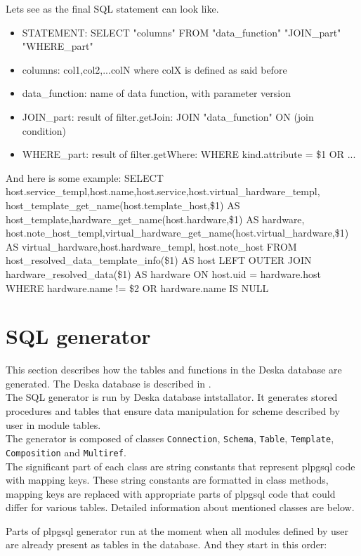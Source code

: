 \documentclass[deska]{subfiles}
\begin{document}
Lets see as the final SQL statement can look like.
\begin{itemize}
\item{STATEMENT}: SELECT "columns" FROM "data\_function" "JOIN\_part" "WHERE\_part"
\item{columns}: col1,col2,...colN where colX is defined as said before
\item{data\_function}: name of data function, with parameter version
\item{JOIN\_part}: result of filter.getJoin: JOIN "data\_function" ON (join condition)
\item{WHERE\_part}: result of filter.getWhere: WHERE kind.attribute = \$1 OR ...
\end{itemize}
And here is some example:
SELECT host.service\_templ,host.name,host.service,host.virtual\_hardware\_templ,
host\_template\_get\_name(host.template\_host,\$1) AS host\_template,hardware\_get\_name(host.hardware,\$1) AS hardware,
host.note\_host\_templ,virtual\_hardware\_get\_name(host.virtual\_hardware,\$1) AS virtual\_hardware,host.hardware\_templ,
host.note\_host FROM host\_resolved\_data\_template\_info(\$1) AS host
LEFT OUTER JOIN hardware\_resolved\_data(\$1) AS hardware ON host.uid = hardware.host
WHERE hardware.name != \$2 OR hardware.name IS NULL 

\section{SQL generator}
\label{sec:sql-generator}
This section describes how the tables and functions in the Deska database are generated. The Deska database is described in .\\
The SQL generator is run by Deska database intstallator. It generates stored procedures and tables that ensure data manipulation for scheme described by user in module tables.\\

The generator is composed of classes {\tt Connection}, {\tt Schema}, {\tt Table}, {\tt Template}, {\tt Composition} and {\tt Multiref}.\\
The significant part of each class are string constants that represent plpgsql code with mapping keys. These string constants are formatted in class methods, mapping keys are replaced with appropriate parts of plpgsql code that could differ for various tables.
Detailed information about mentioned classes are below.

Parts of plpgsql generator run at the moment when all modules defined by user are already present as tables in the database. And they start in this order:
\end{document}
